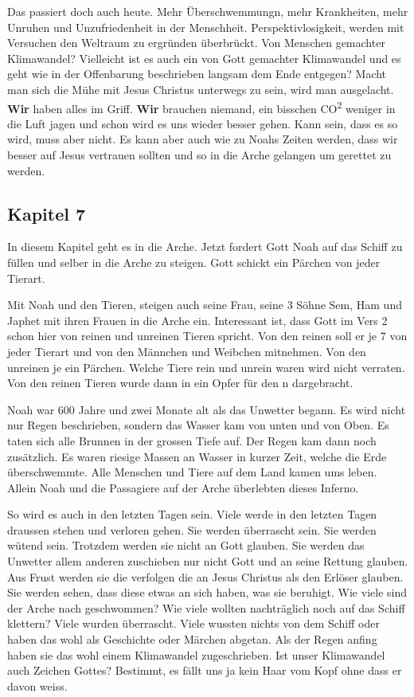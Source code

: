 Das passiert doch auch heute. Mehr Überschwemmungn, mehr Krankheiten, mehr Unruhen und Unzufriedenheit in der Menschheit. Perspektivlosigkeit, werden mit Versuchen den Weltraum zu ergründen überbrückt. Von Menschen gemachter Klimawandel? Vielleicht ist es auch ein von Gott gemachter Klimawandel und es geht wie in der Offenbarung beschrieben langsam dem Ende entgegen? Macht man sich die Mühe mit Jesus Christus unterwegs zu sein, wird man ausgelacht. \textbf{Wir} haben alles im Griff. \textbf{Wir} brauchen niemand, ein bisschen CO\textsuperscript{2} weniger in die Luft jagen und schon wird es uns wieder besser gehen. Kann sein, dass es so wird, muss aber nicht. Es kann aber auch wie zu Noahs Zeiten werden, dass wir besser auf Jesus vertrauen sollten und so in die Arche gelangen um gerettet zu werden.
\subsection{Kapitel 7}
In diesem Kapitel geht es in die Arche. Jetzt fordert Gott Noah auf das Schiff zu füllen und selber in die Arche zu steigen. Gott schickt ein Pärchen von jeder Tierart.

Mit Noah und den Tieren, steigen auch seine Frau, seine 3 Söhne Sem, Ham und Japhet mit ihren Frauen in die Arche ein. Interessant ist, dass Gott im Vers 2 schon hier von reinen und unreinen Tieren spricht. Von den reinen soll er je 7 von jeder Tierart und von den Männchen und Weibchen mitnehmen. Von den unreinen je ein Pärchen. Welche Tiere rein und unrein waren wird nicht verraten. Von den reinen Tieren wurde dann in  ein Opfer für den \herr n dargebracht.

Noah war 600 Jahre und zwei Monate alt als das Unwetter begann. Es wird nicht nur Regen beschrieben, sondern das Wasser kam von unten und von Oben. Es taten sich alle Brunnen in der grossen Tiefe auf. Der Regen kam dann noch zusätzlich. Es waren riesige Massen an Wasser in kurzer Zeit, welche die Erde überschwemmte. Alle Menschen und Tiere auf dem Land kamen ums leben. Allein Noah und die Passagiere auf der Arche überlebten dieses Inferno.

So wird es auch in den letzten Tagen sein. Viele werde in den letzten Tagen draussen stehen und verloren gehen. Sie werden überrascht sein. Sie werden wütend sein. Trotzdem werden sie nicht an Gott glauben. Sie werden das Unwetter allem anderen zuschieben nur nicht Gott und an seine Rettung glauben. Aus Frust werden sie die verfolgen die an Jesus Christus als den Erlöser glauben. Sie werden sehen, dass diese etwas an sich haben, was sie beruhigt. Wie viele sind der Arche nach geschwommen? Wie viele wollten nachträglich noch auf das Schiff klettern? Viele wurden überrascht. Viele wussten nichts von dem Schiff oder haben das wohl als Geschichte oder Märchen abgetan. Als der Regen anfing haben sie das wohl einem Klimawandel zugeschrieben. Ist unser Klimawandel auch Zeichen Gottes? Bestimmt, es fällt uns ja kein Haar vom Kopf ohne dass er davon weiss.

